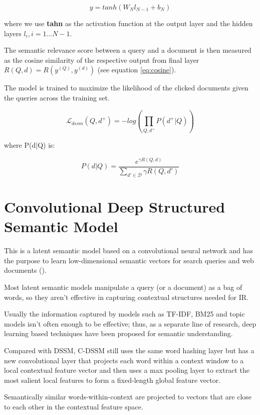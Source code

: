 \begin{equation}
\tag{output layer}
y = tanh(W_N l_{N-1} + b_N)
\end{equation}

where we use \textbf{tahn} as the activation function at the output layer and
the hidden layers $l_i, i = 1...N-1$.

The semantic relevance score between a query and a document is then measured
as the cosine similarity of the respective output from final layer $R(Q, d) = R(y^{(Q)}, y^{(d)})$ (see equation \ref{eq:cosine}).

The model is trained to maximize the likelihood of the clicked documents given
the queries across the training set.

\begin{equation}
\mathcal{L}_{dssm} (Q, d^+) = -log (\prod_{Q,d^+} P(d^+|Q))
\end{equation}

where P(d|Q) is:

\begin{equation}
P(d|Q) = \frac{e^{\gamma R(Q, d)}}{\sum_{d' \in \mathcal{D}} \gamma R(Q, d')}
\end{equation}

\section{Convolutional Deep Structured Semantic Model}

This is a latent semantic model based on a convolutional neural network and
has the purpose to learn low-dimensional semantic vectors for search queries
and web documents (\cite{cdssm}).

Most latent semantic models manipulate a query (or a document) as
a bag of words, so they aren't effective in capturing contextual structures
needed for IR.

Usually the information captured by models such as TF-IDF, BM25 and topic models
isn't often enough to be effective; thus, as a separate line of research, deep learning based techniques have been proposed for semantic understanding.

Compared with DSSM, C-DSSM still uses the same word hashing layer but has a new convolutional layer that projects each word
within a context window to a local contextual feature vector and then uses a max pooling layer to extract the most salient local features to
form a fixed-length global feature vector.

Semantically similar words-within-context are projected to vectors that are
close to each other in the contextual feature space.

